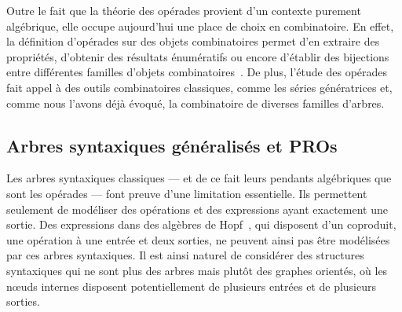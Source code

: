 \documentclass[10pt,reqno]{amsart}
\numberwithin{equation}{subsection}
\begin{document}
Outre le fait que la théorie des opérades provient d'un contexte purement
algébrique, elle occupe aujourd'hui une place de choix en combinatoire. 
En effet, la définition d'opérades sur des objets combinatoires permet 
d'en extraire des propriétés, d'obtenir des résultats énumératifs ou 
encore d'établir des bijections entre différentes familles d'objets
combinatoires~\cite{Cha08,CG14,Gir15}. De plus, l'étude des opérades 
fait appel à des outils combinatoires classiques, comme les séries 
génératrices et, comme nous l'avons déjà évoqué, la combinatoire de 
diverses familles d'arbres.

\subsection{Arbres syntaxiques généralisés et PROs}
Les arbres syntaxiques classiques --- et de ce fait leurs pendants 
algébriques que sont les opérades --- font preuve d'une limitation 
essentielle. Ils permettent seulement de modéliser des opérations et des
expressions ayant exactement une sortie. Des expressions dans des 
algèbres de Hopf~\cite{GR14}, qui disposent d'un coproduit, une opération 
à une entrée et deux sorties, ne peuvent ainsi pas être modélisées par 
ces arbres syntaxiques. Il est ainsi naturel de considérer des structures
syntaxiques qui ne sont plus des arbres mais plutôt des graphes orientés, 
où les n\oe uds internes disposent potentiellement de plusieurs entrées 
et de plusieurs sorties.
\end{document}
